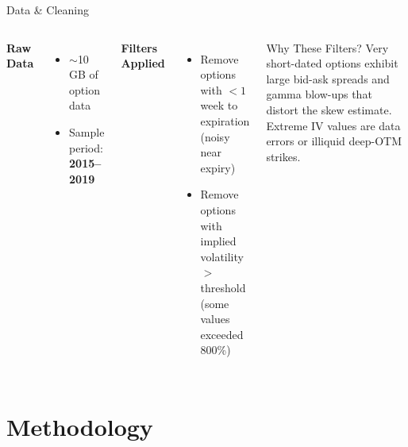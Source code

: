 \documentclass{beamer}
\begin{document}
\begin{frame}{Data \& Cleaning}
  \begin{columns}
      \textbf{Raw Data}
      \begin{itemize}
        \item $\sim$10 GB of option data
        \item Sample period: \textbf{2015--2019}
      \end{itemize}
      \vspace{0.8em}
      \textbf{Filters Applied}
      \begin{itemize}
        \item Remove options with $< 1$ week to expiration\\
              {\small (noisy near expiry)}
        \item Remove options with implied volatility $> $ threshold\\
              {\small (some values exceeded 800\%)}
      \end{itemize}
      \begin{exampleblock}{Why These Filters?}
        Very short-dated options exhibit large bid-ask spreads and
        gamma blow-ups that distort the skew estimate.
        Extreme IV values are data errors or illiquid deep-OTM strikes.
      \end{exampleblock}
  \end{columns}
\end{frame}

\section{Methodology}
\end{document}
